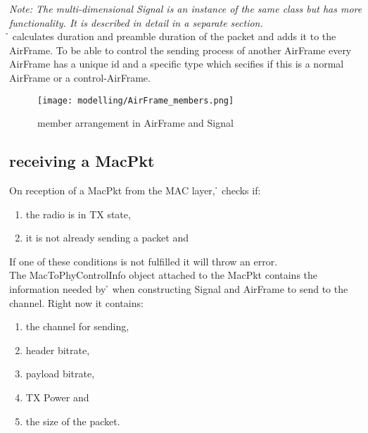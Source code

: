 \emph{Note: The multi-dimensional Signal is an instance of the same class but has more functionality. It is described in detail in a separate section.}\\

\h{\bp} calculates duration and preamble duration of the packet and adds it to the AirFrame. 
To be able to control the sending process of another AirFrame every AirFrame has a unique id and a specific type which secifies if this is a normal AirFrame or a control-AirFrame.


\begin{figure}[H]
 \centering
 \texttt{[image: modelling/AirFrame\_members.png]}
 \caption{member arrangement in AirFrame and Signal}
 \label{fig:memberAirFrame}
\end{figure}
\newpage


\subsection{receiving a MacPkt}

On reception of a MacPkt from the MAC layer, \h{\bp} checks if:
\begin{enumerate}
	\item the radio is in TX state,
	\item it is not already sending a packet and
\end{enumerate} 

If one of these conditions is not fulfilled it will throw an error.\\

The MacToPhyControlInfo object attached to the MacPkt contains the information needed by \h{\bp} when constructing Signal and AirFrame to send to the channel. Right now it contains:

\begin{enumerate}
	\item the channel for sending,
	\item header bitrate,
	\item payload bitrate,
	\item TX Power and
	\item the size of the packet.

\end{enumerate}


